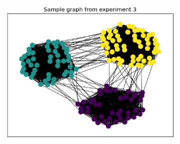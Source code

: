 \documentclass[switch, 12pt]{article}
\begin{document}
\begin{figure}[h]
\begin{subfigure}{0.28\linewidth}
        \includegraphics[width=\linewidth]{figures/exp3_sample.png}
    \end{subfigure}
    \hfill

    \medskip


\end{figure}
\end{document}
